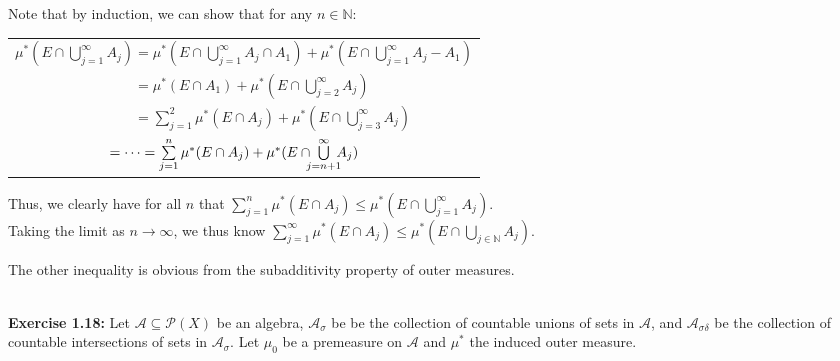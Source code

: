 \documentclass{book}
\newcommand{\exTwoP}{%
   \color{RedViolet}%
   \fontsize{13}{15}\selectfont%
}
\newcommand{\exPP}{%
   \color{RedViolet}%
   \fontsize{12}{14}\selectfont%
}
\newenvironment{myIndent}{%
   \begin{adjustwidth}{2.5em}{0em}%
}{%
   \end{adjustwidth}%
}
\newcommand{\blab}[1]{\textbf{#1}}
\newcommand{\mySepTwo}[1][.]{%
   {\noindent\color{#1}{\rule{6.5in}{0.5mm}}}\\%
}
\newcommand{\retTwo}{\hfill\bigbreak}
\begin{document}
\begin{myIndent}\exTwoP
   Note that by induction, we can show that for any $n \in \mathbb{N}$:

   {\centering\exPP
   \begin{tabular}{l}
      $\mu^*(E \cap \bigcup\limits_{j=1}^\infty A_j) = \mu^*(E \cap \bigcup\limits_{j=1}^\infty A_j \cap A_1) + \mu^*(E \cap \bigcup\limits_{j=1}^\infty A_j - A_1)$\\ [4pt]
      $\phantom{\mu^*(E \cap \bigcup\limits_{j=1}^\infty A_j)} = \mu^*(E \cap A_1) + \mu^*(E \cap \bigcup\limits_{j=2}^\infty A_j)$\\ [4pt]
      $\phantom{\mu^*(E \cap \bigcup\limits_{j=1}^\infty A_j)} = \sum\limits_{j=1}^2\mu^*(E \cap A_j) + \mu^*(E \cap \bigcup\limits_{j=3}^\infty A_j)$\\ [4pt]
      $\phantom{\mu^*(E \cap \bigcup\limits_{j=1}^\infty A_j)} = \cdots = \sum\limits_{j=1}^n \mu^*(E \cap A_j) + \mu^*(E \cap \hspace{-0.5em}\bigcup\limits_{j=n+1}^\infty\hspace{-0.5em} A_j)$
   \end{tabular} \retTwo\par}

   Thus, we clearly have for all $n$ that $\sum\limits_{j=1}^n \mu^*(E \cap A_j) \leq \mu^*(E \cap \bigcup\limits_{j=1}^\infty A_j)$.\\ [-6pt]

   Taking the limit as $n \rightarrow \infty$, we thus know $\sum\limits_{j=1}^\infty \mu^*(E \cap A_j) \leq \mu^*(E \cap \bigcup\limits_{j \in \mathbb{N}}A_j)$.\newpage

   The other inequality is obvious from the subadditivity property of outer measures.\retTwo
\end{myIndent}

\mySepTwo

\blab{Exercise 1.18:} Let $\mathcal{A} \subseteq \mathcal{P}(X)$ be an algebra, $\mathcal{A}_\sigma$ be be the collection of countable unions of sets in $\mathcal{A}$, and $\mathcal{A}_{\sigma\delta}$ be the collection of countable intersections of sets in $\mathcal{A}_{\sigma}$. Let $\mu_0$ be a premeasure on $\mathcal{A}$ and $\mu^*$ the induced outer measure.\retTwo
\end{document}
